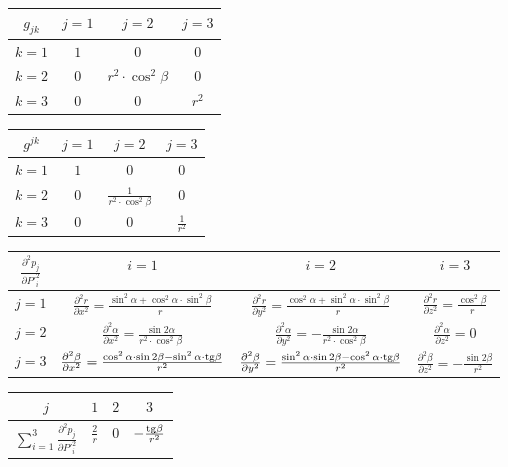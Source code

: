 \begin{tabular}{| c || c | c | c |}
\hline
\(g_{jk}\) & \(j=1\) & \(j=2\) & \(j=3\) \\
\hline
\hline
\(k=1\) & \(1\) & \(0\) & \(0\) \\
\hline
\(k=2\) & \(0\) & \(r^2 \cdot \cos^2 \beta\) & \(0\) \\
\hline
\(k=3\) & \(0\) & \(0\) & \(r^2\) \\
\hline
\end{tabular}

\begin{tabular}{| c || c | c | c |}
\hline
\(g^{jk}\) & \(j=1\) & \(j=2\) & \(j=3\) \\
\hline
\hline
\(k=1\) & \(1\) & \(0\) & \(0\) \\
\hline
\(k=2\) & \(0\) & \(\frac{1}{r^2 \cdot \cos^2 \beta}\) & \(0\) \\
\hline
\(k=3\) & \(0\) & \(0\) & \(\frac{1}{r^2}\) \\
\hline
\end{tabular}

\begin{tabular}{| c || c | c | c |}
\hline
\(\frac{\partial^2 p_j}{\partial P'^2_i}\) & \(i=1\) & \(i=2\) & \(i=3\) \\
\hline
\hline
\(j=1\) & \(\frac{\partial^2 r}{\partial x^2} = \frac{\sin^2 \alpha + \cos^2 \alpha \cdot \sin^2 \beta}{r}\) & \(\frac{\partial^2 r}{\partial y^2} = \frac{\cos^2 \alpha + \sin^2 \alpha \cdot \sin^2 \beta}{r}\) & \(\frac{\partial^2 r}{\partial z^2} = \frac{\cos^2 \beta}{r}\) \\
\hline
\(j=2\) & \(\frac{\partial^2 \alpha}{\partial x^2} = \frac{\sin 2\alpha}{r^2 \cdot \cos^2 \beta}\) & \(\frac{\partial^2 \alpha}{\partial y^2} = -\frac{\sin 2\alpha}{r^2 \cdot \cos^2 \beta}\) & \(\frac{\partial^2 \alpha}{\partial z^2} = 0\) \\
\hline
\(j=3\) & \(\frac{\partial^2 \beta}{\partial x^2} = \frac{\cos^2 \alpha \cdot \sin 2 \beta - \sin^2 \alpha \cdot \mathrm{tg} \beta}{r^2}\) & \(\frac{\partial^2 \beta}{\partial y^2} = \frac{\sin^2 \alpha \cdot \sin 2 \beta - \cos^2 \alpha \cdot \mathrm{tg} \beta}{r^2}\) & \(\frac{\partial^2 \beta}{\partial z^2} = -\frac{\sin 2 \beta}{r^2}\) \\
\hline
\end{tabular}

\begin{tabular}{| c || c | c | c |}
\hline
\(j\) & \(1\) & \(2\) & \(3\) \\
\hline
\hline
\(\sum_{i=1}^3 \frac{\partial^2 p_j}{\partial P'^2_i}\) & \(\frac{2}{r}\) & 0 & \(-\frac{\mathrm{tg} \beta}{r^2}\) \\
\hline
\end{tabular}

